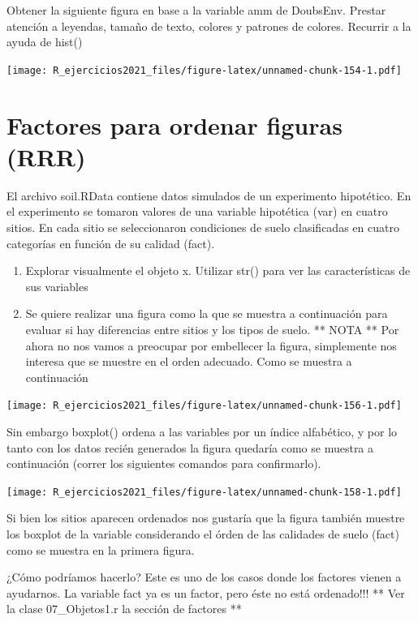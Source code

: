 \documentclass[]{book}
\begin{document}
Obtener la siguiente figura en base a la variable amm de DoubsEnv. Prestar atención a leyendas, tamaño de texto, colores y patrones de colores. Recurrir a la ayuda de hist()

\texttt{[image: R\_ejercicios2021\_files/figure-latex/unnamed-chunk-154-1.pdf]}

\hypertarget{factores-para-ordenar-figuras-rrr}{%
\section{Factores para ordenar figuras (RRR)}\label{factores-para-ordenar-figuras-rrr}}

El archivo soil.RData contiene datos simulados de un experimento hipotético. En el experimento se tomaron valores de una variable hipotética (var) en cuatro sitios. En cada sitio se seleccionaron condiciones de suelo clasificadas en cuatro categorías en función de su calidad (fact).

\begin{enumerate}
\def\labelenumi{\arabic{enumi}.}
\item
  Explorar visualmente el objeto x. Utilizar str() para ver las características de sus variables
\item
  Se quiere realizar una figura como la que se muestra a continuación para evaluar si hay diferencias entre sitios y los tipos de suelo. ** NOTA ** Por ahora no nos vamos a preocupar por embellecer la figura, simplemente nos interesa que se muestre en el orden adecuado. Como se muestra a continuación
\end{enumerate}

\texttt{[image: R\_ejercicios2021\_files/figure-latex/unnamed-chunk-156-1.pdf]}

Sin embargo boxplot() ordena a las variables por un índice alfabético, y por lo tanto con los datos recién generados la figura quedaría como se muestra a continuación (correr los siguientes comandos para confirmarlo).

\texttt{[image: R\_ejercicios2021\_files/figure-latex/unnamed-chunk-158-1.pdf]}

Si bien los sitios aparecen ordenados nos gustaría que la figura también muestre los boxplot de la variable considerando el órden de las calidades de suelo (fact) como se muestra en la primera figura.

¿Cómo podríamos hacerlo? Este es uno de los casos donde los factores vienen a ayudarnos. La variable fact ya es un factor, pero éste no está ordenado!!! ** Ver la clase 07\_Objetos1.r la sección de factores **
\end{document}
